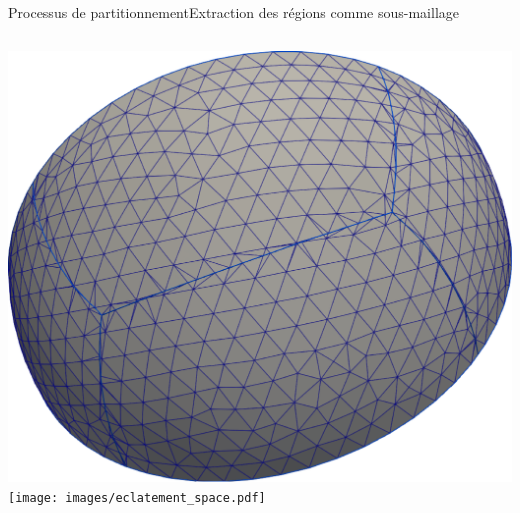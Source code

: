 \documentclass[compress,10pt,aspectratio=169]{beamer}
\begin{document}
\begin{frame}{Processus de partitionnement}{Extraction des régions comme sous-maillage}
\begin{columns}
\begin{column}{0.4\textwidth}
\centering
\includegraphics[scale=0.105]{images/split_triangles_space.pdf}
\\\vspace{0.12cm}
\texttt{[image: images/eclatement\_space.pdf]}\vspace{0.3cm}
\end{column}

\end{columns}
\end{frame}
\end{document}
